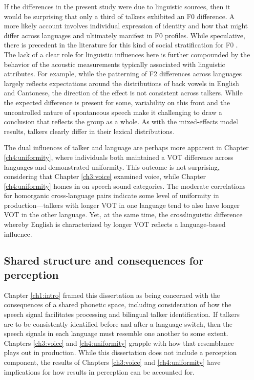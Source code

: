 If the differences in the present study were due to linguistic sources, then it would be surprising that only a third of talkers exhibited an F0 difference. A more likely account involves individual expression of identity and how that might differ across languages and ultimately manifest in F0 profiles. While speculative, there is precedent in the literature for this kind of social stratification for F0 \citep{loveday_1981_pitch, voigt_2016_between}. The lack of a clear role for linguistic influences here is further compounded by the behavior of the acoustic measurements typically associated with linguistic attributes. For example, while the patterning of F2 differences across languages largely reflects expectations around the distributions of back vowels in English and Cantonese, the direction of the effect is not consistent across talkers. While the expected difference is present for some, variability on this front and the uncontrolled nature of spontaneous speech make it challenging to draw a conclusion that reflects the group as a whole. As with the mixed-effects model results, talkers clearly differ in their lexical distributions. 

The dual influences of talker and language are perhaps more apparent in Chapter \ref{ch4:uniformity}, where individuals both maintained a VOT difference across languages and demonstrated uniformity. This outcome is not surprising, considering that Chapter \ref{ch3:voice} examined voice, while Chapter \ref{ch4:uniformity} homes in on speech sound categories. The moderate correlations for homorganic cross-language pairs indicate some level of uniformity in production---talkers with longer VOT in one language tend to also have longer VOT in the other language. Yet, at the same time, the crosslinguistic difference whereby English is characterized by longer VOT reflects a language-based influence. 

\subsection{Shared structure and consequences for perception}

Chapter \ref{ch1:intro} framed this dissertation as being concerned with the consequences of a shared phonetic space, including consideration of how the speech signal facilitates processing and bilingual talker identification. If talkers are to be consistently identified before and after a language switch, then the speech signals in each language must resemble one another to some extent. Chapters \ref{ch3:voice} and \ref{ch4:uniformity} grapple with how that resemblance plays out in production. While this dissertation does not include a perception component, the results of Chapters \ref{ch3:voice} and \ref{ch4:uniformity} have implications for how results in perception can be accounted for. 

